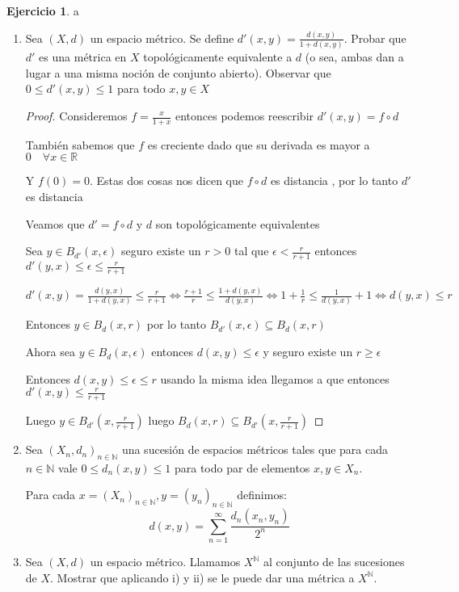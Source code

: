\documentclass[12pt]{report}
\newcommand{\R}{\mathbb{R}}
\newcommand{\N}{\mathbb{N}}
\theoremstyle{definition}
\newtheorem{ej}{Ejercicio}
\begin{document}
\begin{ej} a\\

  \begin{enumerate}
    \item Sea $(X,d)$ un espacio métrico. Se define $d'(x,y) = \frac{d(x,y)}{1 + d(x,y)}$. Probar que $d'$ es una métrica en $X$ topológicamente equivalente a $d$ (o sea, ambas dan a lugar a una misma noción de conjunto abierto). Observar que $0 \leq d'(x,y)\leq 1$ para todo $x,y \in X$
      \begin{proof}
	Consideremos $f = \frac{x}{1 + x}$ entonces podemos reescribir $d'(x,y) = f \circ d$

	También sabemos que $f$ es creciente dado que su derivada es mayor a $0 \quad \forall x \in \R$

	Y $f(0) = 0$. Estas dos cosas nos dicen que $f \circ d $ es distancia , por lo tanto $d'$ es distancia
      
  
Veamos que $d' = f \circ d$ y $d$ son topológicamente equivalentes

Sea $y \in B_{d'}(x,\epsilon)$  seguro existe un $r > 0$ tal que $\epsilon < \frac{r}{r+1}$ entonces $d'(y,x) \leq \epsilon \leq \frac{r}{r +1}$

$d'(x,y) = \frac{d(y,x)}{1 + d(y,x)} \leq \frac{r}{r+1} \iff \frac{r+1}{r} \leq \frac{1 + d(y,x)}{d(y,x)} \iff 1 + \frac{1}{r} \leq \frac{1}{d(y,x)} + 1 \iff d(y,x) \leq r$

Entonces $y \in B_d(x,r)$ por lo tanto $B_{d'}(x,\epsilon) \subseteq B_{d}(x,r)$

Ahora sea $y \in B_d(x,\epsilon)$ entonces $d(x,y) \leq \epsilon$ y seguro existe un $r \geq \epsilon$

Entonces $d(x,y) \leq \epsilon \leq r$ usando la misma idea llegamos a que entonces $d'(x,y) \leq \frac{r}{r+1}$

Luego $y \in B_{d'}(x,\frac{r}{r+1})$ luego $B_d(x,r) \subseteq B_{d'}(x,\frac{r}{r+1})$


      \end{proof}
    \item Sea $(X_n,d_n)_{n \in \N}$ una sucesión de espacios métricos tales que para cada $n \in \N$ vale $0 \leq d_n(x,y)\leq 1$ para todo par de elementos $x,y \in X_n$. 

      Para cada $x  = (X_n)_{n \in \N}, y = (y_n)_{n \in \N}$ definimos:
    $$ d(x,y) = \sum_{n = 1}^{\infty} \frac{d_n(x_n,y_n)}{2^n}$$
\item Sea $(X,d)$ un espacio métrico. Llamamos $X^{\N}$ al conjunto de las sucesiones de $X$. Mostrar que aplicando i) y ii) se le puede dar una métrica a $X^{\N}.$


  \end{enumerate}
\end{ej}
\end{document}
